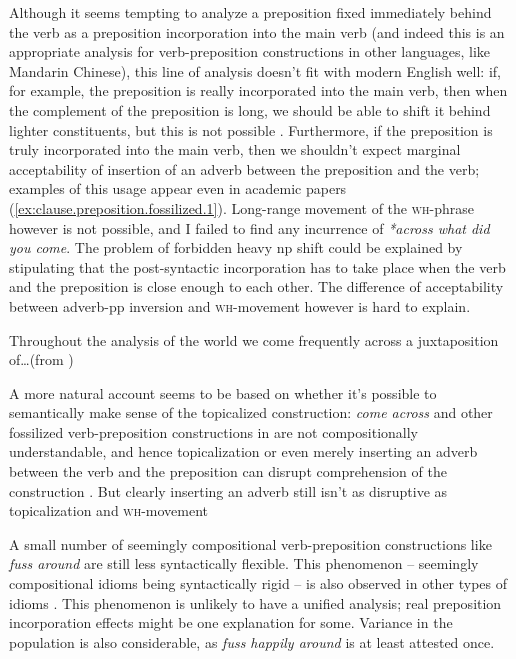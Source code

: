 \documentclass[UTF8, a4paper, oneside, scheme=plain, 12pt]{ctexbook}
\newcommand*{\citesec}[1]{\S~{#1}}
\newcommand*{\citepage}[1]{p.~{#1}}
\newcommand{\form}[1]{\emph{#1}}
\newcommand{\category}[1]{\textsc{#1}}
\begin{document}
Although it seems tempting to analyze a preposition fixed immediately behind the verb as 
a preposition incorporation into the main verb
(and indeed this is an appropriate analysis for verb-preposition constructions in other languages, 
like Mandarin Chinese), 
this line of analysis doesn't fit with modern English well: 
if, for example, the preposition is really incorporated into the main verb, 
then when the complement of the preposition is long, 
we should be able to shift it behind lighter constituents, 
but this is not possible \citep[\citepage{277}]{cgel}.
Furthermore, if the preposition is truly incorporated into the main verb,
then we shouldn't expect marginal acceptability of 
insertion of an adverb between the preposition and the verb;
examples of this usage appear even in academic papers 
(\ref{ex:clause.preposition.fossilized.1}).
Long-range movement of the \category{wh}-phrase however is not possible, 
and I failed to find any incurrence of \form{*across what did you come}.
The problem of forbidden heavy \acs{np} shift  
could be explained by stipulating that 
the post-syntactic incorporation has to take place 
when the verb and the preposition is close enough to each other.
The difference of acceptability between adverb-\acs{pp} inversion 
and \category{wh}-movement however is hard to explain.


\begin{exe}
    \ex\label{ex:clause.preposition.fossilized.1} Throughout the analysis of the world we come frequently across a
    juxtaposition of\dots (from \citet{biemel1980development})
\end{exe}


A more natural account seems to be based on whether it's possible 
to semantically make sense of the topicalized construction: 
\form{come across} and other fossilized verb-preposition constructions 
in \citet[\citepage{278}]{cgel} 
are not compositionally understandable, 
and hence topicalization or even merely inserting an adverb between the verb and the preposition
can disrupt comprehension of the construction \citep{nediger2017unifying}.
But clearly inserting an adverb still isn't as disruptive as topicalization and \category{wh}-movement 

A small number of seemingly compositional verb-preposition constructions like \form{fuss around} 
are still less syntactically flexible.
This phenomenon -- seemingly compositional idioms being syntactically rigid -- 
is also observed in other types of idioms \citep[\citesec{5.7.2}]{nediger2017unifying}.
This phenomenon is unlikely to have a unified analysis; 
real preposition incorporation effects might be one explanation for some.
Variance in the population is also considerable, 
as \form{fuss happily around} is at least attested once.
\end{document}
